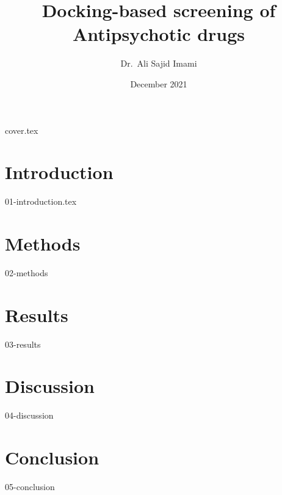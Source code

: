 \documentclass[letterpaper,12pt,oneside]{article}
\title{Docking-based screening of Antipsychotic drugs}
\author{Dr.~Ali Sajid Imami}
\date{December 2021}
\begin{document}
{cover.tex}
\clearpage

\tableofcontents

\section{Introduction}

{01-introduction.tex}

\section{Methods}

{02-methods}

\section{Results}

{03-results}

\section{Discussion}

{04-discussion}

\section{Conclusion}

{05-conclusion}

\clearpage
\printbibliography[title=References]

\clearpage
\end{document}
